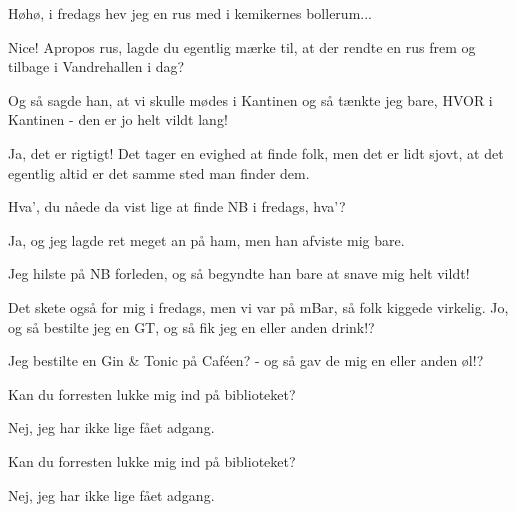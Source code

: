 \documentclass[a4paper,11pt]{article}
\begin{document}
\begin{sketch}
 Høhø, i fredags hev jeg en rus med i kemikernes bollerum...

 Nice! Apropos rus, lagde du egentlig mærke til, at der rendte en rus frem og tilbage i Vandrehallen i dag?

 Og så sagde han, at vi skulle mødes i Kantinen og så tænkte jeg bare, HVOR i Kantinen - den er jo helt vildt lang!

 Ja, det er rigtigt! Det tager en evighed at finde folk, men det er lidt sjovt, at det egentlig altid er det samme sted man finder dem.

 Hva', du nåede da vist lige at finde NB i fredags, hva'? 

 Ja, og jeg lagde ret meget an på ham, men han afviste mig bare.

 Jeg hilste på NB forleden, og så begyndte han bare at snave mig helt vildt!

 Det skete også for mig i fredags, men vi var på mBar, så folk kiggede virkelig. Jo, og så bestilte jeg en GT, og så fik jeg en eller anden drink!?

 Jeg bestilte en Gin \& Tonic på Caféen? - og så gav de mig en eller anden øl!?


 Kan du forresten lukke mig ind på biblioteket?

 Nej, jeg har ikke lige fået adgang.


 Kan du forresten lukke mig ind på biblioteket?

 Nej, jeg har ikke lige fået adgang.

\end{sketch}
\end{document}
